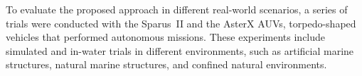 To evaluate the proposed approach in different real-world scenarios, a series of
trials were conducted with the Sparus~II and the AsterX \acp{AUV},
torpedo-shaped vehicles that performed autonomous missions. These experiments
include simulated and in-water trials in different environments, such as
artificial marine structures, natural marine structures, and confined natural
environments.

\vfill


\endgroup			

\vfill